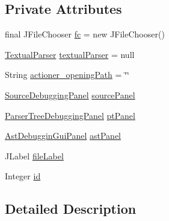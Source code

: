 \subsection*{Private Attributes}
\begin{DoxyCompactItemize}
\item 
final J\-File\-Chooser \hyperlink{classit_1_1emarolab_1_1cagg_1_1debugging_1_1DebuggingGui_1_1DebuggingActioner_ae530a3f533d1fa5c3d3c31e615e9a85e}{fc} = new J\-File\-Chooser()
\item 
\hyperlink{classit_1_1emarolab_1_1cagg_1_1core_1_1language_1_1parser_1_1TextualParser}{Textual\-Parser} \hyperlink{classit_1_1emarolab_1_1cagg_1_1debugging_1_1DebuggingGui_1_1DebuggingActioner_a6014741e60917227611d32f4281b7fa9}{textual\-Parser} = null
\item 
String \hyperlink{classit_1_1emarolab_1_1cagg_1_1debugging_1_1DebuggingGui_1_1DebuggingActioner_af08c906e9130870cf58fd913bf3d8714}{actioner\-\_\-opening\-Path} = \char`\"{}\char`\"{}
\item 
\hyperlink{classit_1_1emarolab_1_1cagg_1_1debugging_1_1baseComponents_1_1customPanel_1_1SourceDebuggingPanel}{Source\-Debugging\-Panel} \hyperlink{classit_1_1emarolab_1_1cagg_1_1debugging_1_1DebuggingGui_1_1DebuggingActioner_ac31fec7501ef39345821128a54a82165}{source\-Panel}
\item 
\hyperlink{classit_1_1emarolab_1_1cagg_1_1debugging_1_1baseComponents_1_1customPanel_1_1ParserTreeDebuggingPanel}{Parser\-Tree\-Debugging\-Panel} \hyperlink{classit_1_1emarolab_1_1cagg_1_1debugging_1_1DebuggingGui_1_1DebuggingActioner_a816eca60baa97774e5ed8516c4617d8b}{pt\-Panel}
\item 
\hyperlink{classit_1_1emarolab_1_1cagg_1_1debugging_1_1baseComponents_1_1customPanel_1_1AstDebugginGuiPanel}{Ast\-Debuggin\-Gui\-Panel} \hyperlink{classit_1_1emarolab_1_1cagg_1_1debugging_1_1DebuggingGui_1_1DebuggingActioner_a870189ea85f6c7ed1da689d899f64fdf}{ast\-Panel}
\item 
J\-Label \hyperlink{classit_1_1emarolab_1_1cagg_1_1debugging_1_1DebuggingGui_1_1DebuggingActioner_aa6f1b84e7710bd0659c194d7023b7b7f}{file\-Label}
\item 
Integer \hyperlink{classit_1_1emarolab_1_1cagg_1_1debugging_1_1DebuggingGui_1_1DebuggingActioner_aee651589881982564b49bd6feba740d2}{id}
\end{DoxyCompactItemize}


\subsection{Detailed Description}



